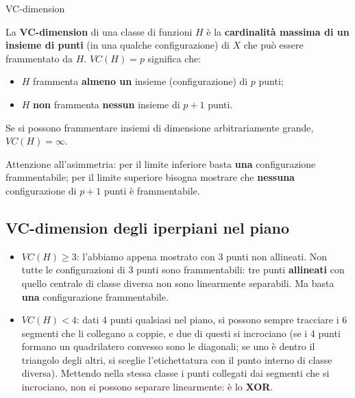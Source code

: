 \begin{boxdefinition}{VC-dimension}

La \textbf{VC-dimension} di una classe di funzioni \(H\) è la
\textbf{cardinalità massima di un insieme di punti} (in una qualche
configurazione) di \(X\) che può essere frammentato da \(H\).
\(VC(H) = p\) significa che:

\begin{itemize}
\tightlist
\item
  \(H\) frammenta \textbf{almeno un} insieme (configurazione) di \(p\)
  punti;
\item
  \(H\) \textbf{non} frammenta \textbf{nessun} insieme di \(p+1\) punti.
\end{itemize}

Se si possono frammentare insiemi di dimensione arbitrariamente grande,
\(VC(H) = \infty\).

\end{boxdefinition}

Attenzione all'asimmetria: per il limite inferiore basta \textbf{una}
configurazione frammentabile; per il limite superiore bisogna mostrare
che \textbf{nessuna} configurazione di \(p+1\) punti è frammentabile.

\subsection{VC-dimension degli iperpiani nel
piano}\label{vc-dimension-degli-iperpiani-nel-piano}

\begin{itemize}
\tightlist
\item
  \textbf{\(VC(H) \ge 3\)}: l'abbiamo appena mostrato con 3 punti non
  allineati. Non tutte le configurazioni di 3 punti sono frammentabili:
  tre punti \textbf{allineati} con quello centrale di classe diversa non
  sono linearmente separabili. Ma basta \textbf{una} configurazione
  frammentabile.
\item
  \textbf{\(VC(H) < 4\)}: dati 4 punti qualsiasi nel piano, si possono
  sempre tracciare i 6 segmenti che li collegano a coppie, e due di
  questi si incrociano (se i 4 punti formano un quadrilatero convesso
  sono le diagonali; se uno è dentro il triangolo degli altri, si
  sceglie l'etichettatura con il punto interno di classe diversa).
  Mettendo nella stessa classe i punti collegati dai segmenti che si
  incrociano, non si possono separare linearmente: è lo \textbf{XOR}.
\end{itemize}

